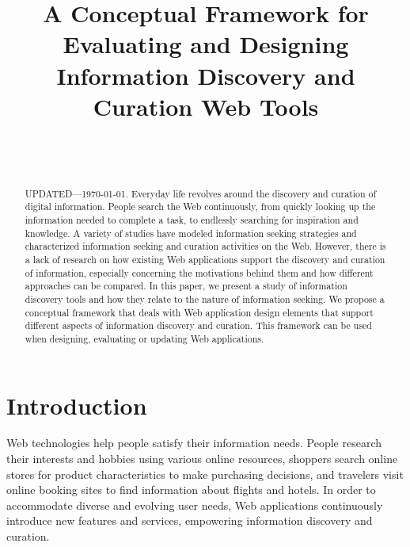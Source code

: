 \documentclass{sigchi}
\begin{document}
\title{A Conceptual Framework for Evaluating and Designing Information Discovery and Curation Web Tools}

\author{%
  \\
  \\
}

\maketitle

\begin{abstract}
  UPDATED---\today. Everyday life revolves around the discovery and curation of digital information. People search the Web continuously, from quickly looking up the information needed to complete a task, to endlessly searching for inspiration and knowledge. A variety of studies have modeled information seeking strategies and characterized information seeking and curation activities on the Web. However, there is a lack of research on how existing Web applications support the discovery and curation of information, especially concerning the motivations behind them and how different approaches can be compared. In this paper, we present a study of information discovery tools and how they relate to the nature of information seeking. We propose a conceptual framework that deals with Web application design elements that support different aspects of information discovery and curation. This framework can be used when designing, evaluating or updating Web applications.
\end{abstract}


 

\section{Introduction}
\label{section:introduction}
Web technologies help people satisfy their information needs. People research their interests and hobbies using various online resources, shoppers search online stores for product characteristics to make purchasing decisions, and travelers visit online booking sites to find information about flights and hotels. In order to accommodate diverse and evolving user needs, Web applications continuously introduce new features and services, empowering information discovery and curation. 
\end{document}
